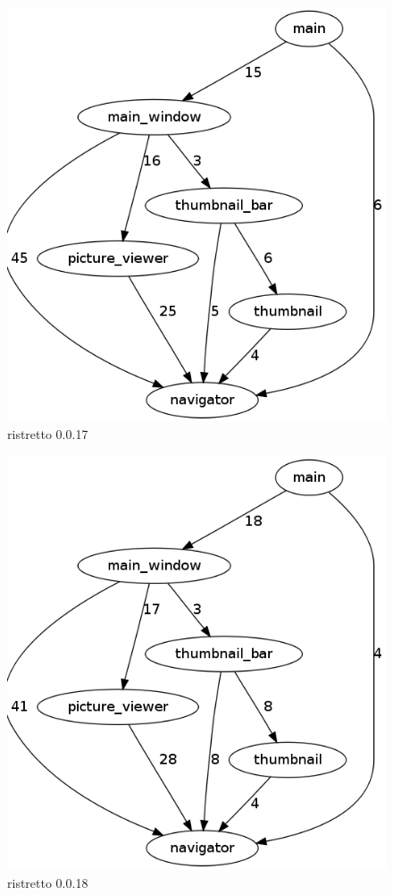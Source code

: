 \begin{figure}[h]
\center
\includegraphics[scale=0.4]{imagens/ristretto-0_0_17-doxyparse-2}
\caption{ristretto 0.0.17}
\label{fig:ristretto-0.0.17-doxyparse-2-anexo}
\end{figure}

\clearpage %

\begin{figure}[h]
\center
\includegraphics[scale=0.4]{imagens/ristretto-0_0_18-doxyparse-2}
\caption{ristretto 0.0.18}
\label{fig:ristretto-0.0.18-doxyparse-2-anexo}
\end{figure}

